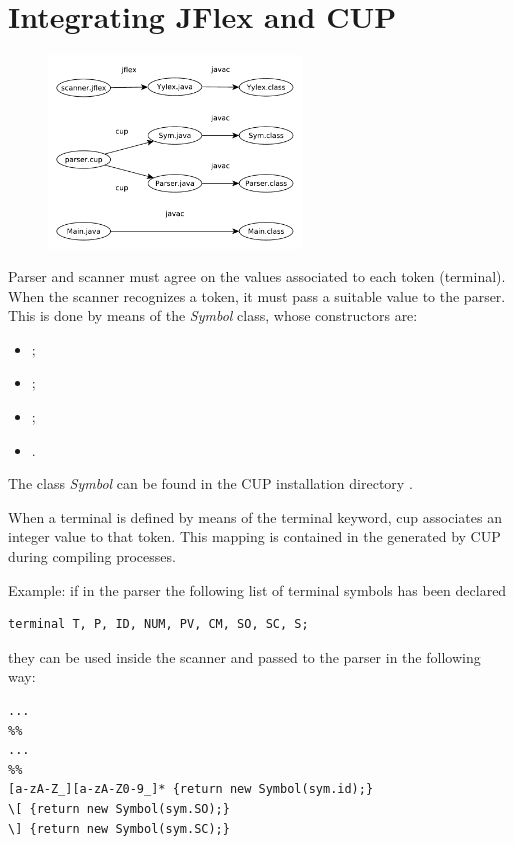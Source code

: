 \section{Integrating JFlex and CUP}
\begin{figure}[H]
    \centerline{\includegraphics[width=0.6\textwidth]{img/19.pdf}}
\end{figure}

Parser and scanner must agree on the values associated to each token (terminal).
When the scanner recognizes a token, it must pass a suitable value to the parser.
This is done by means of the \emph{Symbol} class, whose constructors are:
\begin{itemize}
    \item
    ;
    \item
    ;
    \item
    ;
    \item
    .
\end{itemize}
The class \emph{Symbol} can be found in the CUP installation directory .

When a terminal is defined by means of the terminal keyword, cup associates an integer value to that token.
This mapping is contained in the  generated by CUP during compiling processes.

Example: if in the parser the following list of terminal symbols has been declared
\begin{lstlisting}
terminal T, P, ID, NUM, PV, CM, SO, SC, S;
\end{lstlisting}
they can be used inside the scanner and passed to the parser in the following way:
\begin{lstlisting}
...
%%
...
%%
[a-zA-Z_][a-zA-Z0-9_]* {return new Symbol(sym.id);}
\[ {return new Symbol(sym.SO);}
\] {return new Symbol(sym.SC);}
\end{lstlisting}

